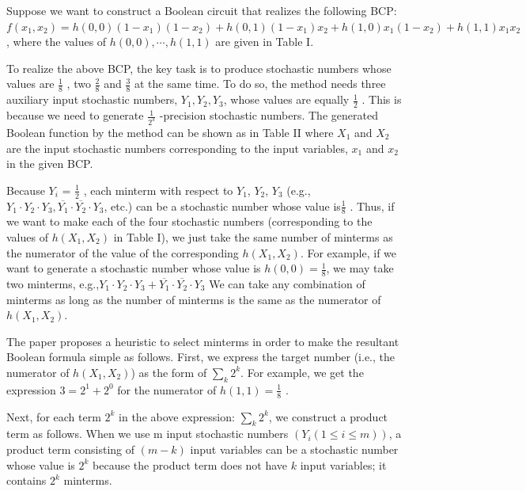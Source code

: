 \documentclass[10pt,conference]{IEEEtran}
\begin{document}
Suppose we want to construct a Boolean circuit that realizes
the following BCP: $f(x_1, x_2) =h(0, 0)(1 - x_1)(1 - x_2) +
h(0, 1)(1 - x_1)x_2 + h(1, 0)x_1(1 - x_2) + h(1, 1)x_1x_2$, where
the values of $h(0, 0), \cdots , h(1, 1)$ are given in Table I.

\par
To realize the above BCP, the key task is to produce
stochastic numbers whose values are $\frac{1}
{8}$ , two $\frac{2}{8}$ and $\frac{3}{8}$ at the
same time. To do so, the method \cite{fifteen} needs three auxiliary
input stochastic numbers, $Y_1, Y_2, Y_3$, whose values are equally $\frac{1}{2}$ . This is because we need to generate $\frac{1}{2^3}$ -precision stochastic
numbers. The generated Boolean function by the method \cite{fifteen}
can be shown as in Table II where $X_1$ and $X_2$ are the input
stochastic numbers corresponding to the input variables, $x_1$
and $x_2$ in the given BCP.

\par
Because $Y_i$ = $\frac{1}{2}$ , each minterm with respect to $Y_1$, $Y_2$, $Y_3$
(e.g., $Y_1 \cdot Y_2 \cdot Y_3, \overline{Y_1}\cdot\overline{Y_2}\cdot Y_3$, etc.) can be a stochastic number
whose value is$\frac{1}{8}$ . Thus, if we want to make each of the four
stochastic numbers (corresponding to the values of $h(X_1, X_2)$
in Table I), we just take the same number of minterms as the
numerator of the value of the corresponding $h(X_1, X_2)$. For
example, if we want to generate a stochastic number whose
value is $h(0, 0) = \frac{1}{8}$, we may take two minterms, e.g.,$Y_1\cdot Y_2 \cdot Y_3 + \overline{Y_1}\cdot\overline{Y_2}\cdot Y_3$ We can take any combination of minterms as
long as the number of minterms is the same as the numerator
of $h(X_1, X_2)$.

\par
The paper \cite{fifteen} proposes a heuristic to select minterms in
order to make the resultant Boolean formula simple as follows.
First, we express the target number (i.e., the numerator of
$h(X_1, X_2)$) as the form of $\sum_{k} 2^{k}$. For example, we get the
expression $3 = 2^1 + 2^0$ for the numerator of $h(1, 1) = \frac{1}{8}$ .

\par
Next, for each term $2^k$ in the above expression: $\sum_{k} 2^{k}$,
we construct a product term as follows. When we use m
input stochastic numbers $(Y_i (1 \leq i \leq m))$, a product term
consisting of $(m - k)$ input variables can be a stochastic
number whose value is $2^k$ because the product term does not
have $k$ input variables; it contains $2^k$ minterms.
\smallskip
\end{document}
